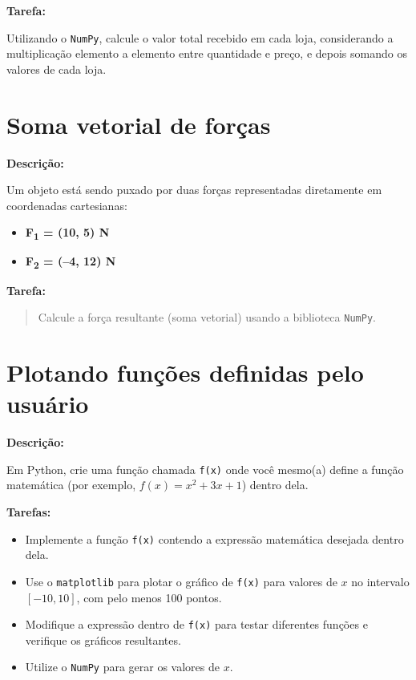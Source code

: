 \textbf{Tarefa:}

Utilizando o \texttt{NumPy}, calcule o valor total recebido em cada loja, considerando a multiplicação elemento a elemento entre quantidade e preço, e depois somando os valores de cada loja.


\section{Soma vetorial de forças}

\textbf{Descrição:}

Um objeto está sendo puxado por duas forças representadas diretamente em coordenadas cartesianas:

\begin{itemize}
    \item \textbf{F\textsubscript{1} = (10, 5) N}
    \item \textbf{F\textsubscript{2} = (–4, 12) N}
\end{itemize}

\textbf{Tarefa:}

\begin{quote}
    Calcule a força resultante (soma vetorial) usando a biblioteca \texttt{NumPy}.
\end{quote}


\section{Plotando funções definidas pelo usuário}

\textbf{Descrição:}

Em Python, crie uma função chamada \texttt{f(x)} onde você mesmo(a) define a função matemática (por exemplo, \(f(x) = x^2 + 3x + 1\)) dentro dela.

\textbf{Tarefas:}

\begin{itemize}
    \item Implemente a função \texttt{f(x)} contendo a expressão matemática desejada dentro dela.
    \item Use o \texttt{matplotlib} para plotar o gráfico de \texttt{f(x)} para valores de \(x\) no intervalo \([-10, 10]\), com pelo menos 100 pontos.
    \item Modifique a expressão dentro de \texttt{f(x)} para testar diferentes funções e verifique os gráficos resultantes.
    \item Utilize o \texttt{NumPy} para gerar os valores de \(x\).
\end{itemize}


